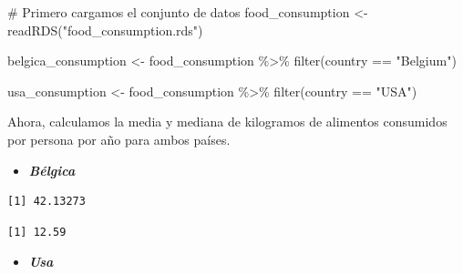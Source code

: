 \documentclass[
  letterpaper,
  DIV=11,
  numbers=noendperiod]{scrreprt}
\newenvironment{Shaded}{\begin{snugshade}}{\end{snugshade}}
\newcommand{\CommentTok}[1]{\textcolor[rgb]{0.37,0.37,0.37}{#1}}
\newcommand{\FunctionTok}[1]{\textcolor[rgb]{0.28,0.35,0.67}{#1}}
\newcommand{\NormalTok}[1]{\textcolor[rgb]{0.00,0.23,0.31}{#1}}
\newcommand{\OtherTok}[1]{\textcolor[rgb]{0.00,0.23,0.31}{#1}}
\newcommand{\SpecialCharTok}[1]{\textcolor[rgb]{0.37,0.37,0.37}{#1}}
\newcommand{\StringTok}[1]{\textcolor[rgb]{0.13,0.47,0.30}{#1}}
\providecommand{\tightlist}{%
  \setlength{\itemsep}{0pt}\setlength{\parskip}{0pt}}\usepackage{longtable,booktabs,array}
\begin{document}
\begin{Shaded}
\begin{Highlighting}[]
\CommentTok{\# Primero cargamos el conjunto de datos}
\NormalTok{food\_consumption }\OtherTok{\textless{}{-}} \FunctionTok{readRDS}\NormalTok{(}\StringTok{"food\_consumption.rds"}\NormalTok{)}

\NormalTok{belgica\_consumption }\OtherTok{\textless{}{-}}\NormalTok{ food\_consumption }\SpecialCharTok{\%\textgreater{}\%} 
  \FunctionTok{filter}\NormalTok{(country }\SpecialCharTok{==} \StringTok{"Belgium"}\NormalTok{)}

\NormalTok{usa\_consumption }\OtherTok{\textless{}{-}}\NormalTok{ food\_consumption }\SpecialCharTok{\%\textgreater{}\%} 
  \FunctionTok{filter}\NormalTok{(country }\SpecialCharTok{==} \StringTok{"USA"}\NormalTok{)}
\end{Highlighting}
\end{Shaded}

Ahora, calculamos la media y mediana de kilogramos de alimentos
consumidos por persona por año para ambos países.

\begin{itemize}
\tightlist
\item
  \textbf{\emph{Bélgica}}
\end{itemize}

\begin{Shaded}
\end{Shaded}

\begin{verbatim}
[1] 42.13273
\end{verbatim}

\begin{Shaded}
\end{Shaded}

\begin{verbatim}
[1] 12.59
\end{verbatim}

\begin{itemize}
\tightlist
\item
  \textbf{\emph{Usa}}
\end{itemize}
\end{document}
